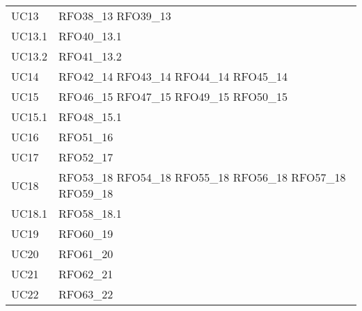 \begin{longtable}{C{6cm} C{6cm}}
    UC13 & RFO38\_13 \newline RFO39\_13 \\
    UC13.1 & RFO40\_13.1 \\
    UC13.2 & RFO41\_13.2 \\
    UC14 & RFO42\_14 \newline RFO43\_14 \newline RFO44\_14 \newline RFO45\_14 \\
    UC15 & RFO46\_15 \newline RFO47\_15 \newline RFO49\_15 \newline RFO50\_15 \\
    UC15.1 & RFO48\_15.1 \\
    UC16 & RFO51\_16 \\
    UC17 & RFO52\_17 \\
    UC18 & RFO53\_18 \newline RFO54\_18 \newline RFO55\_18 \newline RFO56\_18 \newline RFO57\_18 \newline RFO59\_18 \\
    UC18.1 & RFO58\_18.1 \\
    UC19 & RFO60\_19 \\
    UC20 & RFO61\_20 \\
    UC21 & RFO62\_21 \\
    UC22 & RFO63\_22 \\

\end{longtable}
